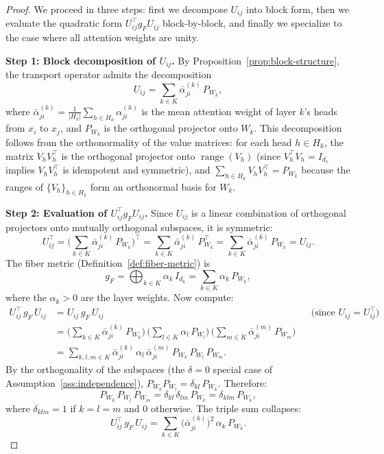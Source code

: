 \begin{proof}
We proceed in three steps: first we decompose $U_{ij}$ into block form, then we
evaluate the quadratic form $U_{ij}^\top g_F U_{ij}$ block-by-block, and finally
we specialize to the case where all attention weights are unity.

\medskip\noindent\textbf{Step 1: Block decomposition of $U_{ij}$.}
By Proposition~\ref{prop:block-structure}, the transport operator admits the
decomposition
\[
    U_{ij} = \sum_{k \in K} \bar{\alpha}_{ji}^{(k)}\, P_{W_k},
\]
where $\bar{\alpha}_{ji}^{(k)} = \frac{1}{|H_k|} \sum_{h \in H_k} \alpha_{ji}^{(h)}$ is
the mean attention weight of layer $k$'s heads from $x_i$ to $x_j$, and $P_{W_k}$ is the
orthogonal projector onto $W_k$. This decomposition follows from the orthonormality of the
value matrices: for each head $h \in H_k$, the matrix $V_h V_h^\top$ is the orthogonal
projector onto $\operatorname{range}(V_h)$ (since $V_h^\top V_h = I_{d_v}$ implies $V_h
V_h^\top$ is idempotent and symmetric), and $\sum_{h \in H_k} V_h V_h^\top = P_{W_k}$
because the ranges of $\{V_h\}_{h \in H_k}$ form an orthonormal basis for $W_k$.

\medskip\noindent\textbf{Step 2: Evaluation of $U_{ij}^\top g_F U_{ij}$.}
Since $U_{ij}$ is a linear combination of orthogonal projectors onto mutually orthogonal
subspaces, it is symmetric:
\[
    U_{ij}^\top = \Big(\sum_{k \in K} \bar{\alpha}_{ji}^{(k)}\, P_{W_k}\Big)^\top
               = \sum_{k \in K} \bar{\alpha}_{ji}^{(k)}\, P_{W_k}^\top
               = \sum_{k \in K} \bar{\alpha}_{ji}^{(k)}\, P_{W_k} = U_{ij}.
\]
The fiber metric (Definition~\ref{def:fiber-metric}) is
\[
    g_F = \bigoplus_{k \in K} \alpha_k\, I_{d_k} = \sum_{k \in K} \alpha_k\, P_{W_k},
\]
where the $\alpha_k > 0$ are the layer weights. Now compute:
\begin{align*}
    U_{ij}^\top\, g_F\, U_{ij}
    &= U_{ij}\, g_F\, U_{ij}
      && \text{(since } U_{ij} = U_{ij}^\top \text{)} \\[4pt]
    &= \Big(\sum_{k \in K} \bar{\alpha}_{ji}^{(k)}\, P_{W_k}\Big)\,
       \Big(\sum_{l \in K} \alpha_l\, P_{W_l}\Big)\,
       \Big(\sum_{m \in K} \bar{\alpha}_{ji}^{(m)}\, P_{W_m}\Big) \\[4pt]
    &= \sum_{k,l,m \in K} \bar{\alpha}_{ji}^{(k)}\, \alpha_l\,
       \bar{\alpha}_{ji}^{(m)}\, P_{W_k}\, P_{W_l}\, P_{W_m}.
\end{align*}
By the orthogonality of the subspaces (the $\delta = 0$ special case of
Assumption~\ref{ass:independence}),
$P_{W_k} P_{W_l} = \delta_{kl}\, P_{W_k}$. Therefore:
\[
    P_{W_k}\, P_{W_l}\, P_{W_m} = \delta_{kl}\, \delta_{lm}\, P_{W_k} = \delta_{klm}\,
    P_{W_k},
\]
where $\delta_{klm} = 1$ if $k = l = m$ and $0$ otherwise. The triple sum collapses:
\begin{equation}
\label{eq:metric-quadratic}
    U_{ij}^\top\, g_F\, U_{ij}
    = \sum_{k \in K} \big(\bar{\alpha}_{ji}^{(k)}\big)^2\, \alpha_k\, P_{W_k}.
\end{equation}


\end{proof}
